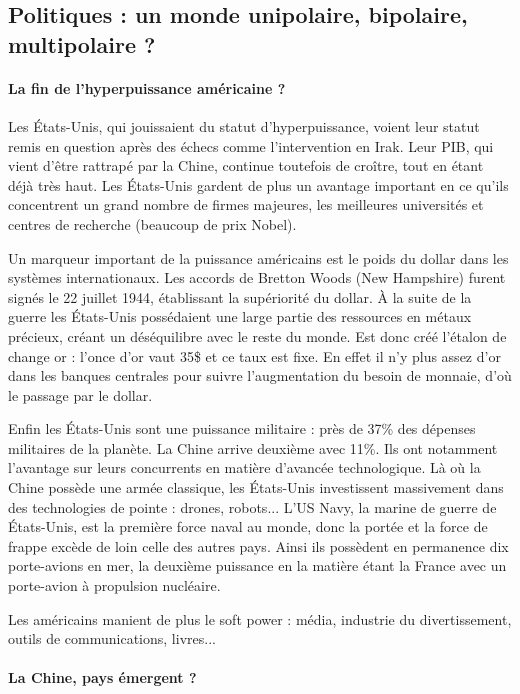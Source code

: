 \documentclass[a4paper,10pt]{article}
\begin{document}
	\subsection{Politiques : un monde unipolaire, bipolaire, multipolaire ?}

		\paragraph{La fin de l’hyperpuissance américaine ?}

		Les États-Unis, qui jouissaient du statut d'hyperpuissance, voient leur statut remis en question après des échecs comme l'intervention en Irak.
		Leur PIB, qui vient d'être rattrapé par la Chine, continue toutefois de croître, tout en étant déjà très haut.
		Les États-Unis gardent de plus un avantage important en ce qu'ils concentrent un grand nombre de firmes majeures, les meilleures universités et centres de recherche (beaucoup de prix Nobel).

		Un marqueur important de la puissance américains est le poids du dollar dans les systèmes internationaux.
		Les accords de Bretton Woods (New Hampshire) furent signés le 22 juillet 1944, établissant la supériorité du dollar.
		À la suite de la guerre les États-Unis possédaient une large partie des ressources en métaux précieux, créant un déséquilibre avec le reste du monde.
		Est donc créé l'étalon de change or : l'once d'or vaut 35\$ et ce taux est fixe.
		En effet il n'y plus assez d'or dans les banques centrales pour suivre l'augmentation du besoin de monnaie, d'où le passage par le dollar.

		Enfin les États-Unis sont une puissance militaire : près de 37\% des dépenses militaires de la planète.
		La Chine arrive deuxième avec 11\%.
		Ils ont notamment l'avantage sur leurs concurrents en matière d'avancée technologique.
		Là où la Chine possède une armée classique, les États-Unis investissent massivement dans des technologies de pointe : drones, robots...
		L'US Navy, la marine de guerre de États-Unis, est la première force naval au monde, donc la portée et la force de frappe excède de loin celle des autres pays.
		Ainsi ils possèdent en permanence dix porte-avions en mer, la deuxième puissance en la matière étant la France avec un porte-avion à propulsion nucléaire.

		Les américains manient de plus le soft power : média, industrie du divertissement, outils de communications, livres...

		\paragraph{La Chine, pays émergent ?}
\end{document}
